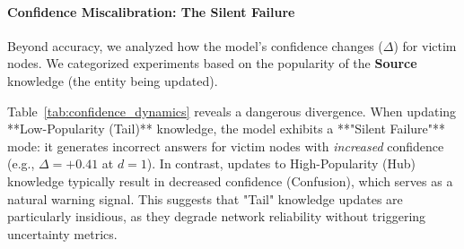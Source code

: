 \begin{table}[h]
\centering
\small
{}
\caption{\label{tab:transition_matrix} \textbf{Victim Vulnerability Analysis}. High-popularity victims show a consistently higher Flip Rate (C$\to$W) than low-popularity ones, indicating they are more prone to immediate failure upon network disturbance. Low-popularity nodes, conversely, tend to enter a "Chaos" state (W$\to$W).}
\end{table}

\paragraph{Confidence Miscalibration: The Silent Failure}
Beyond accuracy, we analyzed how the model's confidence changes ($\Delta$) for victim nodes. We categorized experiments based on the popularity of the \textbf{Source} knowledge (the entity being updated).

Table~\ref{tab:confidence_dynamics} reveals a dangerous divergence. When updating **Low-Popularity (Tail)** knowledge, the model exhibits a **"Silent Failure"** mode: it generates incorrect answers for victim nodes with \emph{increased} confidence (e.g., $\Delta=+0.41$ at $d=1$). In contrast, updates to High-Popularity (Hub) knowledge typically result in decreased confidence (Confusion), which serves as a natural warning signal. This suggests that "Tail" knowledge updates are particularly insidious, as they degrade network reliability without triggering uncertainty metrics.


